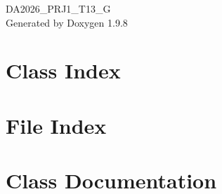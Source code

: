 \documentclass[twoside]{book}
\newcommand{\+}{\discretionary{\mbox{\scriptsize$\hookleftarrow$}}{}{}}
\newcommand{\clearemptydoublepage}{%
    \newpage{\pagestyle{empty}\cleardoublepage}%
  }
\begin{document}
  \raggedbottom
    \hypersetup{pageanchor=false,
                bookmarksnumbered=true,
                pdfencoding=unicode
               }
  \begin{titlepage}
  \vspace*{7cm}
  \begin{center}%
  {\Large DA2026\+\_\+\+PRJ1\+\_\+\+T13\+\_\+G}\\
  \vspace*{1cm}
  {\large Generated by Doxygen 1.9.8}\\
  \end{center}
  \end{titlepage}
  \clearemptydoublepage
  \tableofcontents
  \clearemptydoublepage
  \hypersetup{pageanchor=true}



\chapter{Class Index}

\chapter{File Index}

\chapter{Class Documentation}










\end{document}
